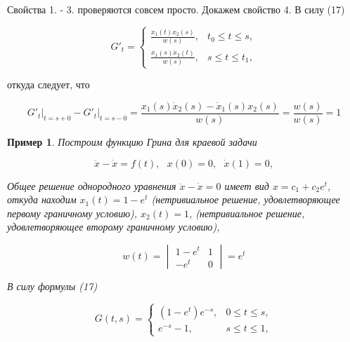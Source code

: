 \documentclass{article}
\theoremstyle{plain} \newtheorem*{theorem*}{Теорема}
\theoremstyle{plain} \newtheorem{theorem}{Теорема}[section]
\theoremstyle{defintition} \newtheorem*{corollary*}{Следствие}
\theoremstyle{plain} \newtheorem*{example*}{Пример}
\theoremstyle{plain} \newtheorem*{remark*}{Замечание}
\begin{document}
Свойства 1. - 3. проверяются совсем просто. Докажем свойство 4.
В силу (17)

\begin{equation*}
    G'_t =
    \begin{cases}
        \frac{\dot{x}_1(t) x_2(s)}{w(s)}, &t_0 \le t \le s, \\
        \frac{x_1(s) \dot{x}_2(t)}{w(s)}, &s \le t \le t_1,
    \end{cases}
\end{equation*}

откуда следует, что

\begin{equation*}
    G'_t \vert_{t = s + 0} - G'_t \vert_{t = s - 0}
    = \frac{x_1(s) \dot{x}_2(s) - \dot{x}_1(s) x_2(s)}{w(s)}
    = \frac{w(s)}{w(s)} = 1
\end{equation*}

\begin{example*}

    Построим функцию Грина для краевой задачи

    \begin{equation*}
        \ddot{x} - \dot{x} = f(t), \ \ \ x(0) = 0,
        \ \ \ \dot{x}(1) = 0,
    \end{equation*}

    Общее решение однородного уравнения
    $\ddot{x} - \dot{x} = 0$ имеет вид $x = c_1 + c_2 e^t$,
    откуда находим $x_1(t) = 1 - e^t$ (нетривиальное решение,
    удовлетворяющее первому граничному условию), $x_2(t) = 1$,
    (нетривиальное решение, удовлетворяющее второму граничному
    условию),

    \begin{equation*}
        w(t) =
        \begin{vmatrix}
            1 - e^t & 1 \\
            -e^t & 0
        \end{vmatrix} = e^t
    \end{equation*}

    В силу формулы (17)

    \begin{equation*}
        G(t,s) =
        \begin{cases}
            (1 - e^t)e^{-s}, &0 \le t \le s, \\
            e^{-s} - 1, &s \le t \le 1,
        \end{cases}
    \end{equation*}


\end{example*}
\end{document}
